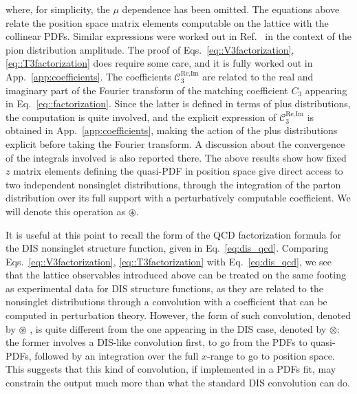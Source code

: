 where, for simplicity, the $\mu$ dependence has been omitted. 
The equations above relate the position space matrix elements computable on the lattice with
the collinear PDFs. Similar expressions were worked out in Ref.~\cite{Bali:2017gfr} in the context of
the pion distribution amplitude.   
The proof of Eqs.~\eqref{eq::V3factorization}, \eqref{eq::T3factorization} does require some
care, and it is fully worked out in App.~\ref{app:coefficients}. The coefficients $\mathcal{C}_3^{\text{Re},\text{Im}}$
are related to the real and imaginary part of the Fourier transform of the matching coefficient 
$C_3$ appearing in Eq.~\eqref{eq::factorization}. Since the latter is defined in terms of plus distributions,
the computation is quite involved, and the explicit expression of $\mathcal{C}_3^{\text{Re},\text{Im}}$
is obtained in App.~\ref{app:coefficients}, making the action of the plus distributions explicit before taking the Fourier transform.  
A discussion about the convergence of the
integrals involved is also reported there. The above results show how fixed $z$
matrix elements defining the quasi-PDF in position space give direct access to
two independent nonsinglet distributions, through the integration of the parton
distribution over its full support with a perturbatively computable coefficient.
We will denote this operation as $\circledast$. 

It is useful at this point to recall the form of the QCD factorization formula
for the DIS nonsinglet structure function, given in Eq.~\eqref{eq:dis_qcd}.
Comparing Eqs.~\eqref{eq::V3factorization}, \eqref{eq::T3factorization}  with
Eq.~\eqref{eq:dis_qcd}, we see that the lattice observables introduced
above can be treated on the same footing as experimental data for DIS structure
functions, as they are related to the nonsinglet distributions through a
convolution with a coefficient that can be computed in perturbation theory.
%
However, the form of such convolution, denoted by $\circledast$ , is quite
different from the one appearing in the DIS case, denoted by $\otimes$: the
former involves a DIS-like convolution first, to go from the PDFs to quasi-PDFs,
followed by an integration over the full $x$-range to go to position space. This
suggests that this kind of convolution, if implemented in a PDFs fit, may
constrain the output much more than what the standard DIS convolution can do. 


